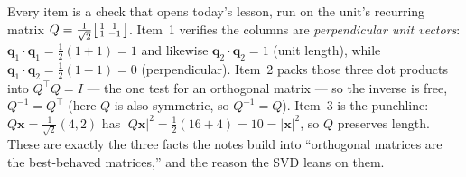 \documentclass[10pt]{article}
\newcommand{\xx}{\mathbf{x}}
\newcommand{\qq}{\mathbf{q}}
\newcommand{\T}{^{\top}}
\begin{document}
\begin{teachernote}
Every item is a check that opens today's lesson, run on the unit's recurring matrix
$Q=\tfrac1{\sqrt2}\begin{bsmallmatrix} 1 & 1\\ 1 & -1 \end{bsmallmatrix}$. Item~1 verifies the columns are
\emph{perpendicular unit vectors}: $\qq_1\cdot\qq_1=\tfrac12(1{+}1)=1$ and likewise $\qq_2\cdot\qq_2=1$ (unit
length), while $\qq_1\cdot\qq_2=\tfrac12(1{-}1)=0$ (perpendicular). Item~2 packs those three dot products into
$Q\T Q=I$ --- the one test for an orthogonal matrix --- so the inverse is free, $Q^{-1}=Q\T$ (here $Q$ is also
symmetric, so $Q^{-1}=Q$). Item~3 is the punchline: $Q\xx=\tfrac1{\sqrt2}(4,2)$ has
$|Q\xx|^2=\tfrac12(16{+}4)=10=|\xx|^2$, so $Q$ preserves length. These are exactly the three facts the notes
build into ``orthogonal matrices are the best-behaved matrices,'' and the reason the SVD leans on them.
\end{teachernote}
\end{document}
